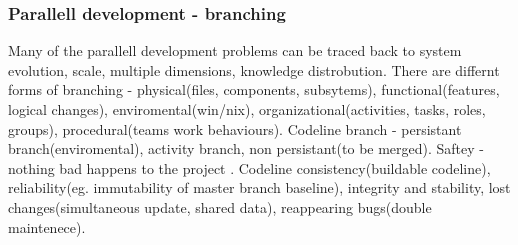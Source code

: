 \documentclass{article}
\begin{document}
\begin{itemize}
    \subsubsection{Parallell development - branching}
    Many of the parallell development problems can be traced back to system evolution, scale, multiple dimensions, knowledge distrobution.
    There are differnt forms of branching - physical(files, components, subsytems), functional(features, logical changes), enviromental(win/nix), organizational(activities, tasks, roles, groups), procedural(teams work behaviours).
    Codeline branch - persistant branch(enviromental), activity branch, non persistant(to be merged).
    Saftey - nothing bad happens to the project . Codeline consistency(buildable codeline), reliability(eg. immutability of master branch baseline), integrity and stability, lost changes(simultaneous update, shared data), reappearing bugs(double maintenece).
    \end{itemize}
    
    
\end{document}
